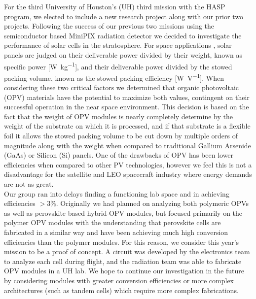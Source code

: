 	For the third University of Houston's (UH) third mission with the HASP program, we elected to include a new research project along with our prior two projects. Following the success of our previous two missions \cite{SORA1} \cite{SORA2} using the semiconductor based MiniPIX radiation detector we decided to investigate the performance of solar cells in the stratosphere. For space applications \cite{space power}, solar panels are judged on their deliverable power divided by their weight, known as specific power [\si{\watt\per\kilo\gram}], and their deliverable power divided by the stowed packing volume, known as the stowed packing efficiency [\si{\watt\per\volt}]. When considering these two critical factors we determined that organic photovoltaic (OPV) materials have the potential to maximize both values\cite{OPV space}, contingent on their successful operation in the near space environment. This decision is based on the fact that the weight of OPV modules is nearly completely determine by the weight of the substrate on which it is processed, and if that substrate is a flexible foil it allows the stowed packing volume to be cut down by multiple orders of magnitude along with the weight when compared to traditional Gallium Arsenide (GaAs) or Silicon (Si) panels. One of the drawbacks of OPV has been lower efficiencies when compared to other PV technologies, however we feel this is not a disadvantage for the satellite and LEO spacecraft industry where energy demands are not as great.\\
	
	 Our group ran into delays finding a functioning lab space and in achieving efficiencies $>$3\%. Originally we had planned on analyzing both polymeric OPVs as well as perovskite based hybrid-OPV modules, but focused primarily on the polymer OPV modules with the understanding that perovskite cells are fabricated in a similar way\cite{perovskite} and have been achieving much high conversion efficiencies than the polymer modules. For this reason, we consider this year's mission to be a proof of concept. A circuit was developed by the electronics team to analyze each cell during flight, and the radiation team was able to fabricate OPV modules in a UH lab. We hope to continue our investigation in the future by considering modules with greater conversion efficiencies or more complex architectures (such as tandem cells) which require more complex fabrications. 
